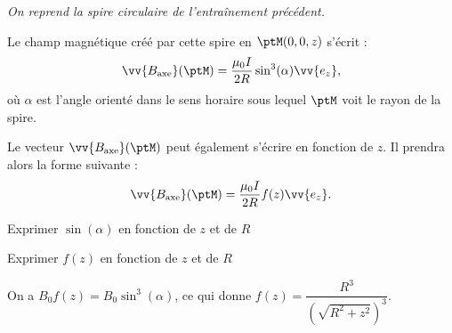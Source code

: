 \hauteurLargeurCadreReponse		{8mm}{5cm}
\initialisationEntrainement

{\itshape On reprend la spire circulaire de l'entraînement précédent.}

Le champ magnétique créé par cette spire en $\ptM (0,0,z)$ s'écrit : 
\[
\vv{B_{\text{axe}}}(\ptM)=\dfrac{\mu_0 I}{2R}\sin^3(\alpha)\vv{e_z},
\] 
où $\alpha$ est l'angle orienté dans le sens horaire sous lequel $\ptM$ voit le rayon de la spire.


Le vecteur $\vv{B_{\text{axe}}}(\ptM)$ peut également s'écrire en fonction de $z$. Il prendra alors la forme suivante : 
 \[
 \vv{B_{\text{axe}}}(\ptM)=\dfrac{\mu_0 I}{2R}f(z)\vv{e_z}.
 \]

\debutEntrainement



\begin{enonce}
Exprimer $\sin(\alpha)$ en fonction de $z$ et de $R$
\end{enonce}







\begin{enonce}
Exprimer $f(z)$ en fonction de $z$ et de $R$ 
\end{enonce}


\begin{corrige}
On a $B_0 f(z)= B_0 \sin^3(\alpha)$, ce qui donne $f(z)=\dfrac{R^3}{\left(\sqrt{R^2+z^2}\right)^3}$.
\end{corrige}

